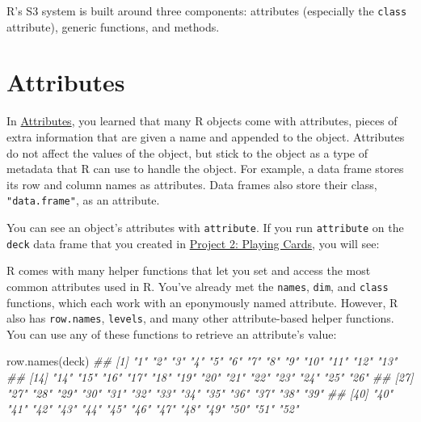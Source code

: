 \documentclass[
  letterpaper,
  DIV=11,
  numbers=noendperiod]{scrbook}
\newenvironment{Shaded}{\begin{snugshade}}{\end{snugshade}}
\newcommand{\DocumentationTok}[1]{\textcolor[rgb]{0.37,0.37,0.37}{\textit{#1}}}
\newcommand{\FunctionTok}[1]{\textcolor[rgb]{0.28,0.35,0.67}{#1}}
\newcommand{\NormalTok}[1]{\textcolor[rgb]{0.00,0.23,0.31}{#1}}
\begin{document}
R's S3 system is built around three components: attributes (especially
the \texttt{class} attribute), generic functions, and methods.

\section{Attributes}\label{attributes}

In \hyperref[sec-attributes]{Attributes}, you learned that many R
objects come with attributes, pieces of extra information that are given
a name and appended to the object. Attributes do not affect the values
of the object, but stick to the object as a type of metadata that R can
use to handle the object. For example, a data frame stores its row and
column names as attributes. Data frames also store their class,
\texttt{"data.frame"}, as an attribute.

You can see an object's attributes with \texttt{attribute}. If you run
\texttt{attribute} on the \texttt{deck} data frame that you created in
\hyperref[sec-project-cards]{Project 2: Playing Cards}, you will see:

\begin{Shaded}
\end{Shaded}

R comes with many helper functions that let you set and access the most
common attributes used in R. You've already met the \texttt{names},
\texttt{dim}, and \texttt{class} functions, which each work with an
eponymously named attribute. However, R also has \texttt{row.names},
\texttt{levels}, and many other attribute-based helper functions. You
can use any of these functions to retrieve an attribute's value:

\begin{Shaded}
\begin{Highlighting}[]
\FunctionTok{row.names}\NormalTok{(deck)}
\DocumentationTok{\#\#  [1] "1"  "2"  "3"  "4"  "5"  "6"  "7"  "8"  "9"  "10" "11" "12" "13"}
\DocumentationTok{\#\# [14] "14" "15" "16" "17" "18" "19" "20" "21" "22" "23" "24" "25" "26"}
\DocumentationTok{\#\# [27] "27" "28" "29" "30" "31" "32" "33" "34" "35" "36" "37" "38" "39"}
\DocumentationTok{\#\# [40] "40" "41" "42" "43" "44" "45" "46" "47" "48" "49" "50" "51" "52"}
\end{Highlighting}
\end{Shaded}
\end{document}
